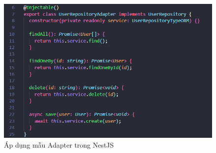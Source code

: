 \begin{figure}[H]

    \centering

    \includegraphics[scale = 0.9]{pictures/_dich_vu_nguoi_dung_nestjs_su_dung_kien_truc_luc_giac/main.png}

    \caption{Áp dụng mẫu Adapter trong  NestJS}

\end{figure}





















